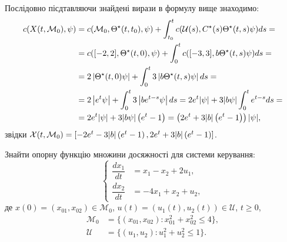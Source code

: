 \begin{solution}
    
    Послідовно пісдтавляючи знайдені вирази в формулу вище знаходимо:
    \begin{equation*}
    \begin{split}
        c(X(t, \mathcal{M}_0), \psi) &= c(\mathcal{M}_0, \Theta^\star(t, t_0), \psi) + \int_{t_0}^t c(\mathcal{U}(s), C^\star(s) \Theta^\star(t, s)\psi) ds = \\
        &= c([-2,2], \Theta^\star(t, 0), \psi) + \int_0^t c([-3, 3], b \Theta^\star(t, s)\psi) ds = \\
        &= 2\left|\Theta^\star(t, 0)\psi\right| + \int_0^t 3\left|b \Theta^\star(t, s)\psi\right| ds = \\
        &= 2\left|e^t\psi\right| + \int_0^t 3\left|b e^{t-s}\psi\right| ds = 2e^t|\psi| + 3|b \psi| \int_0^t e^{t-s} ds = \\
        &= 2e^t|\psi| + 3|b \psi| \left(e^t - 1\right) = \left(2e^t + 3|b|\left(e^t - 1\right)\right) |\psi|,
    \end{split}
    \end{equation*}
    звідки $\mathcal{X}(t, \mathcal{M}_0) = \left[-2e^t - 3|b|\left(e^t - 1\right), 2e^t + 3|b|\left(e^t - 1\right)\right]$.
\end{solution}

\begin{problem}
Знайти опорну функцію множини досяжності для системи керування:
\begin{equation*}
    \left\{
    \begin{aligned}
    \dfrac{dx_1}{dt} &= x_1 - x_2 + 2u_1, \\
    \dfrac{dx_2}{dt} &= -4x_1 + x_2 + u_2,
    \end{aligned}
    \right.
\end{equation*}
де $x(0) = (x_{01}, x_{02}) \in \mathcal{M}_0$, $u(t) = (u_1(t), u_2(t)) \in\mathcal{U}$, $t\ge0$,
\begin{align*}
    \mathcal{M}_0 &= \{(x_{01},x_{02}): x_{01}^2 + x_{02}^2 \le 4\}, \\
    \mathcal{U} &= \{(u_1, u_2): u_1^2 + u_2^2 \le 1\}.
\end{align*}
\end{problem}

